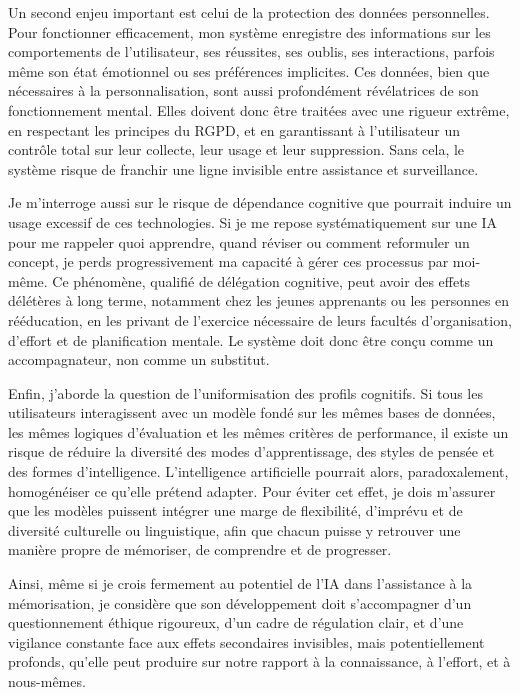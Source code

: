 \documentclass[11pt,a4paper]{report}
\begin{document}
Un second enjeu important est celui de la protection des données personnelles. Pour fonctionner efficacement, mon système enregistre des informations sur les comportements de l’utilisateur, ses réussites, ses oublis, ses interactions, parfois même son état émotionnel ou ses préférences implicites. Ces données, bien que nécessaires à la personnalisation, sont aussi profondément révélatrices de son fonctionnement mental. Elles doivent donc être traitées avec une rigueur extrême, en respectant les principes du RGPD, et en garantissant à l’utilisateur un contrôle total sur leur collecte, leur usage et leur suppression. Sans cela, le système risque de franchir une ligne invisible entre assistance et surveillance.

Je m’interroge aussi sur le risque de dépendance cognitive que pourrait induire un usage excessif de ces technologies. Si je me repose systématiquement sur une IA pour me rappeler quoi apprendre, quand réviser ou comment reformuler un concept, je perds progressivement ma capacité à gérer ces processus par moi-même. Ce phénomène, qualifié de délégation cognitive, peut avoir des effets délétères à long terme, notamment chez les jeunes apprenants ou les personnes en rééducation, en les privant de l’exercice nécessaire de leurs facultés d’organisation, d’effort et de planification mentale. Le système doit donc être conçu comme un accompagnateur, non comme un substitut.

Enfin, j’aborde la question de l’uniformisation des profils cognitifs. Si tous les utilisateurs interagissent avec un modèle fondé sur les mêmes bases de données, les mêmes logiques d’évaluation et les mêmes critères de performance, il existe un risque de réduire la diversité des modes d’apprentissage, des styles de pensée et des formes d’intelligence. L’intelligence artificielle pourrait alors, paradoxalement, homogénéiser ce qu’elle prétend adapter. Pour éviter cet effet, je dois m’assurer que les modèles puissent intégrer une marge de flexibilité, d’imprévu et de diversité culturelle ou linguistique, afin que chacun puisse y retrouver une manière propre de mémoriser, de comprendre et de progresser.

Ainsi, même si je crois fermement au potentiel de l’IA dans l’assistance à la mémorisation, je considère que son développement doit s’accompagner d’un questionnement éthique rigoureux, d’un cadre de régulation clair, et d’une vigilance constante face aux effets secondaires invisibles, mais potentiellement profonds, qu’elle peut produire sur notre rapport à la connaissance, à l’effort, et à nous-mêmes.
\end{document}
